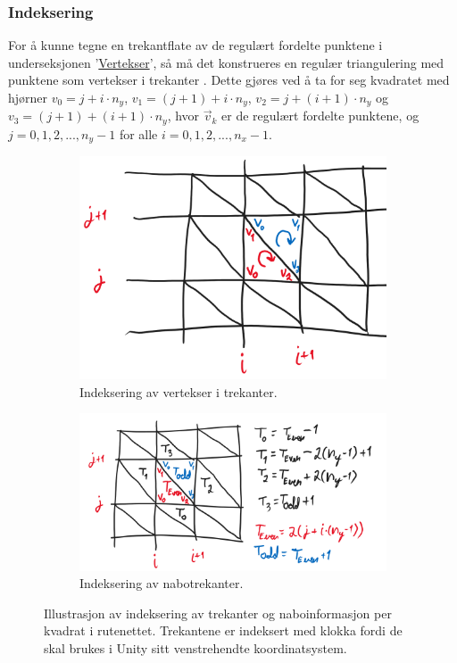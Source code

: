 \documentclass[norsk, doc, 11pt, a4paper]{apa7}  %
\begin{document}
\subsubsection{Indeksering}
For å kunne tegne en trekantflate av de regulært fordelte punktene i underseksjonen '\hyperref[M:1:1]{Vertekser}', så må det konstrueres en regulær triangulering med punktene som vertekser i trekanter \parencite[ss.140-141]{nylundMAT301MatematikkIII2023}. Dette gjøres ved å ta for seg kvadratet med hjørner \(v_{0} = j + i\cdot n_{y}\), \(v_{1} = (j+1) + i\cdot n_{y}\), \(v_{2} = j + (i+1)\cdot n_{y}\) og \(v_{3} = (j+1) + (i+1)\cdot n_{y}\), hvor \(\vec{v}_{k}\) er de regulært fordelte punktene, og \(j=0,1,2,...,n_{y}-1\) for alle \(i=0,1,2,...,n_{x}-1\).
\begin{figure}[H]
	\centering
	\begin{subfigure}{.5\textwidth}
		\centering
		\includegraphics[width=.6\linewidth]{figs/Indices.png}
		\caption{Indeksering av vertekser i trekanter.}
	\end{subfigure}%
	\begin{subfigure}{.5\textwidth}
		\centering
		\includegraphics[width=\linewidth]{figs/Neighbours.png}
		\caption{Indeksering av nabotrekanter.}
	\end{subfigure}
	\caption{Illustrasjon av indeksering av trekanter og naboinformasjon per kvadrat i rutenettet. Trekantene er indeksert med klokka fordi de skal brukes i Unity sitt venstrehendte koordinatsystem.}
\end{figure}
\end{document}
